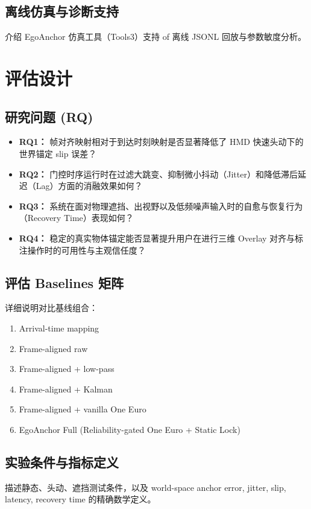 \documentclass[review]{vgtc}
\begin{document}
\subsection{离线仿真与诊断支持}
介绍 EgoAnchor 仿真工具（Tools3）支持 of 离线 JSONL 回放与参数敏度分析。

\section{评估设计}

\subsection{研究问题 (RQ)}
\begin{itemize}
  \item \textbf{RQ1：} 帧对齐映射相对于到达时刻映射是否显著降低了 HMD 快速头动下的世界锚定 slip 误差？
  \item \textbf{RQ2：} 门控时序运行时在过滤大跳变、抑制微小抖动（Jitter）和降低滞后延迟（Lag）方面的消融效果如何？
  \item \textbf{RQ3：} 系统在面对物理遮挡、出视野以及低频噪声输入时的自愈与恢复行为（Recovery Time）表现如何？
  \item \textbf{RQ4：} 稳定的真实物体锚定能否显著提升用户在进行三维 Overlay 对齐与标注操作时的可用性与主观信任度？
\nobreak
\end{itemize}

\subsection{评估 Baselines 矩阵}
详细说明对比基线组合：
\begin{enumerate}
  \item Arrival-time mapping
  \item Frame-aligned raw
  \item Frame-aligned + low-pass
  \item Frame-aligned + Kalman
  \item Frame-aligned + vanilla One Euro
  \item EgoAnchor Full (Reliability-gated One Euro + Static Lock)
\end{enumerate}

\subsection{实验条件与指标定义}
描述静态、头动、遮挡测试条件，以及 world-space anchor error, jitter, slip, latency, recovery time 的精确数学定义。
\end{document}
